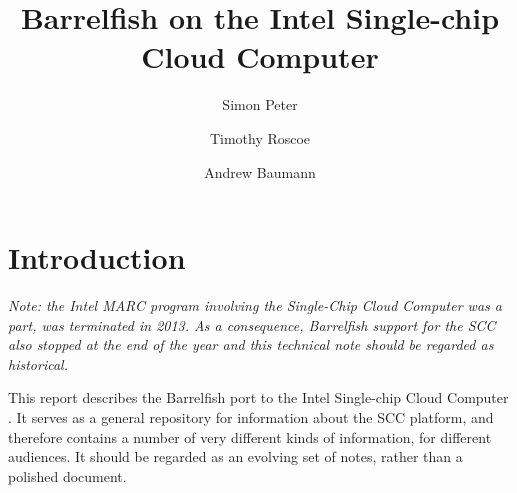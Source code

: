 \documentclass[a4paper,twoside]{report} %
\title{Barrelfish on the Intel Single-chip Cloud Computer}   %
\author{Simon Peter \and Timothy Roscoe \and Andrew Baumann}	%
\begin{document}
\maketitle

%
%
\begin{versionhistory}
\end{versionhistory}



\newcommand{\eclipse}{ECL\textsuperscript{i}PS\textsuperscript{e}\xspace}
\newcommand{\codesize}{\scriptsize}
\newcommand{\note}[1]{[\textcolor{red}{\emph{#1}}]}

\chapter{Introduction}

\textit{Note: the Intel MARC program involving the Single-Chip Cloud
  Computer was a part, was terminated in 2013.  As a consequence,
  Barrelfish support for the SCC also stopped at the end of the year
  and this technical note should be regarded as historical.}

This report describes the Barrelfish port to the Intel Single-chip
Cloud Computer \cite{intel:scc:isscc10}.   It serves as a general
repository for information about the SCC platform, and therefore
contains a number of very different kinds of information, for
different audiences.  It should be regarded as an evolving set of
notes, rather than a polished document. 
\end{document}

